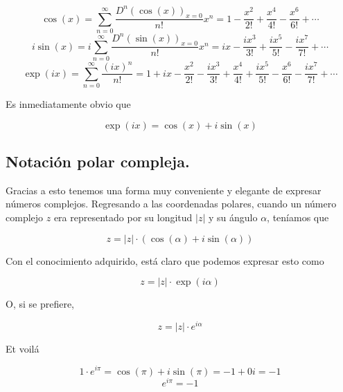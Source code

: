 $$\cos(x)  =  \sum\limits_{n=0}^{\infty} \frac{D^n(\cos(x))_{x=0}}{n!} x^n = 1 - \frac{x^2}{2!} + \frac{x^4}{4!} - \frac{x^6}{6!} + \cdots$$
$$i\sin(x) = i\sum\limits_{n=0}^{\infty} \frac{D^n(\sin(x))_{x=0}}{n!} x^n = ix - \frac{ix^3}{3!} + \frac{ix^5}{5!} - \frac{ix^7}{7!} + \cdots$$
$$\exp(ix) =  \sum\limits_{n=0}^{\infty} \frac{(ix)^n}{n!} = 1 + ix - \frac{x^2}{2!} - \frac{ix^3}{3!} + \frac{x^4}{4!} + \frac{ix^5}{5!} - \frac{x^6}{6!} - \frac{ix^7}{7!} + \cdots$$

Es inmediatamente obvio que

$$\exp(ix) = \cos(x) + i\sin(x)$$

\subsection{Notación polar compleja.}

Gracias a esto tenemos una forma muy conveniente y elegante de expresar números complejos. Regresando a las coordenadas polares, cuando un número complejo $z$ era representado por su longitud $|z|$ y su ángulo $\alpha$, teníamos que

$$z = |z| \cdot (\cos(\alpha) + i\sin(\alpha))$$

Con el conocimiento adquirido, está claro que podemos expresar esto como

$$z = |z| \cdot \exp(i\alpha)$$

O, si se prefiere,

$$z = |z| \cdot e^{i\alpha}$$

Et voilá

$$1\cdot e^{i\pi} = \cos(\pi) + i\sin(\pi) = -1 + 0i = -1$$
$$e^{i\pi} = -1$$

\newpage

